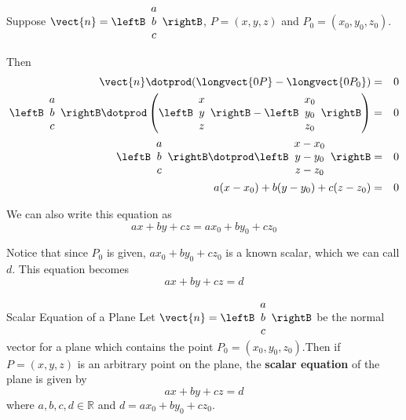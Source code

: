 Suppose $\vect{n} = \leftB
\begin{array}{c}
a \\
b \\
c
\end{array}
\rightB$, $P = \left( x,y,z\right)$ and $P_0 = (x_0, y_0, z_0 )$.

Then 
\begin{eqnarray*}
\vect{n} \dotprod (\longvect{0P} - \longvect{0P_0}) &=& 0 \\
\leftB
\begin{array}{c}
a \\
b \\
c
\end{array}
\rightB
\dotprod
\left(
\leftB
\begin{array}{c}
x \\
y \\
z
\end{array}
\rightB
-
\leftB
\begin{array}{c}
x_0 \\
y_0 \\
z_0
\end{array}
\rightB
\right) 
&=& 0 \\
\leftB
\begin{array}{c}
a \\
b \\
c
\end{array}
\rightB
\dotprod
\leftB
\begin{array}{c}
x - x_0 \\
y - y_0 \\
z - z_0
\end{array}
\rightB
&=& 0 
\\
a(x - x_0) + b (y - y_0) + c (z-z_0) &=& 0 
\end{eqnarray*}

We can also write this equation as 
\[
ax + by + cz = ax_0 + by_0 + cz_0
\]

Notice that since $P_0$ is given, $ax_0+by_0+cz_0$ is a known scalar, which we can call $d$. This equation becomes
\[
ax + by + cz = d
\]

\begin{definition}{Scalar Equation of a Plane}\label{def:scalareqnplane}
Let $\vect{n} = \leftB 
\begin{array}{c}
a \\
b \\
c
\end{array}
\rightB $
be the normal vector for a plane which contains the point $P_0 = (x_0, y_0, z_0)$.Then if $P=(x,y,z)$ is an arbitrary point on the plane, the  \textbf{scalar equation} of the plane is given by
\[
ax + by + cz = d 
\]
where $ a,b,c,d \in \mathbb{R}$ and $d = ax_0 + by_0 + cz_0$.
\end{definition}

